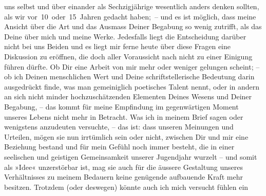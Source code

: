 \begin{ledgroupsized}[t]{13cm}
               uns selbst und über einander als Sechzigjährige wesentlich anders denken sollten, als
               wir vor 10 oder 15 Jahren gedacht haben; – und es ist möglich, dass meine Ansicht
               über die Art und das Ausmass Deiner Begabung so wenig zutrifft, als das Deine über
               mich und meine Werke.\pend
           \pstart
           Jedesfalls liegt die Entscheidung darüber nicht bei uns Beiden und es liegt mir ferne
                  heute über diese Fragen eine Diskussion zu
               eröffnen, die doch aller Voraussicht nach nicht zu einer Einigung führen dürfte.\pend
           \pstart
           Ob Dir eine Arbeit von mir mehr oder weniger gelungen scheint; – ob ich Deinen
               menschlichen Wert und Deine schriftstellerische Bedeutung darin ausgedrückt finde,
               was man gemeiniglich poetisches Talent nennt, oder in andern an sich nicht minder
               hochzuschätzenden Elementen Deines Wesens und Deiner Begabung, – das kommt für meine
               Empfindung im gegenwärtigen Moment unseres Lebens nicht mehr in Betracht.\pend
           \pstart
           Was ich in meinem Brief sagen oder wenigstens anzudeuten versuchte, – das ist: dass
                   unseren Meinungen und Urteilen, mögen sie nun
               irrtümlich sein oder nicht, zwischen Dir und mir eine Beziehung bestand und für mein
               Gefühl noch immer besteht, die in einer seelischen und geistigen Gemeinsamkeit
               unserer Jugendjahr wurzelt – und somit als »Idee« unzerstörbar ist, mag sie auch {\pb}für die äussere Gestaltung unseres Verhältnisses zu
               meinem Bedauern keine genügende aufbauende Kraft mehr besitzen.\pend
           \pstart
           Trotzdem (oder deswegen) könnte auch ich mich versucht fühlen ein \label{K_L03519-2v}
\end{ledgroupsized}
